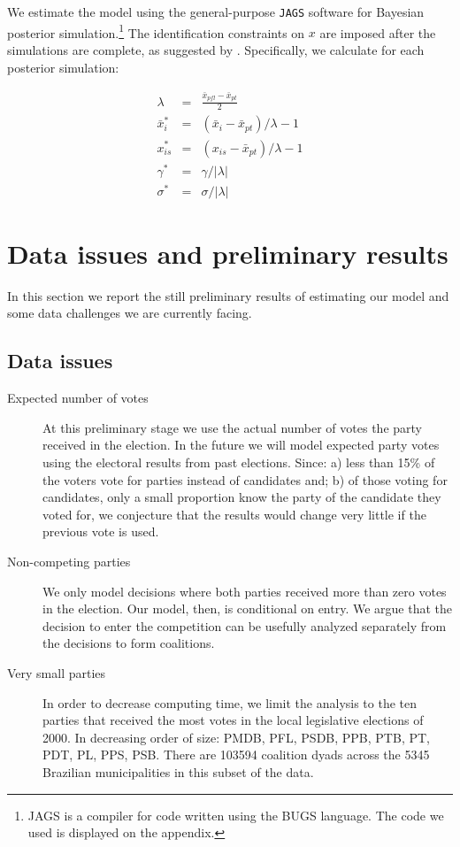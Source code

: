 We estimate the model using the general-purpose \texttt{JAGS} \citep{plummer:2007} software for Bayesian posterior simulation.\footnote{JAGS is a compiler for code written using the BUGS language. The code we used is displayed on the appendix.}  The identification constraints on $x$ are imposed after the simulations are complete, as suggested by \citet{bafumi:2005}. Specifically, we  calculate for each posterior simulation:

\begin{eqnarray}
   \label{eq:2}
   \lambda&=&\frac{\bar x_{pfl}-\bar x_{pt}}{2}\\
   \bar x_{i}^*&=&(\bar x_{i}-\bar x_{pt})/\lambda-1\\
   x_{is}^*&=&(x_{is}-\bar x_{pt})/\lambda-1\\
   \gamma^*&=&\gamma/|\lambda|\\
   \sigma^*&=&\sigma/|\lambda|
 \end{eqnarray}


 \section{Data issues and  preliminary results}
 \label{sec:results}  

 In this section we report the still preliminary results of estimating our model and some data challenges we are currently facing.
 
 \subsection{Data issues}
 \label{sec:data-issues}

\begin{description}
\item[Expected number of votes] At this preliminary stage we use the actual number of votes the party received in the election. In the future we will model expected party votes using the electoral results from past elections. Since: a) less than 15\% of the voters vote for parties instead of candidates and; b) of those voting for candidates, only a small proportion know the party of the candidate they voted for, we conjecture that the results would  change very little if  the previous vote is used. 
\item[Non-competing parties] We only model decisions where both parties received more than zero votes in the election. Our model, then, is conditional on entry. We argue that the decision to enter the competition can be usefully analyzed separately from the decisions to form coalitions. 
\item[Very small parties]  In order to decrease computing time, we limit the analysis to the ten parties that received the most votes in the local legislative elections of 2000. In decreasing order of size: PMDB, PFL, PSDB, PPB, PTB, PT, PDT, PL, PPS, PSB. There are 103594 coalition dyads across the 5345 Brazilian municipalities in this subset of the data. 
\end{description}

